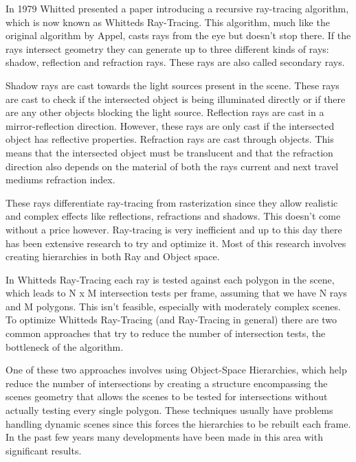 \documentclass{llncs}
\begin{document}
\medskip

In 1979 Whitted \cite{Whitted80} presented a paper introducing a recursive ray-tracing algorithm, which is now known as Whitteds Ray-Tracing. 
This algorithm, much like the original algorithm by Appel, casts rays from the eye but doesn't stop there. 
If the rays intersect geometry they can generate up to three different kinds of rays: shadow, reflection and refraction rays. These rays are also called secondary rays.

\medskip

Shadow rays are cast towards the light sources present in the scene. These rays are cast to check if the intersected object is being illuminated directly or if there are any other objects blocking the light source. 
Reflection rays are cast in a mirror-reflection direction. However, these rays are only cast if the intersected object has reflective properties. 
Refraction rays are cast through objects. This means that the intersected object must be translucent and that the refraction direction also depends on the material of both the rays current and next travel mediums refraction index.

\medskip

These rays differentiate ray-tracing from rasterization since they allow realistic and complex effects like reflections, refractions and shadows. This doesn't come without a price however. Ray-tracing is very inefficient and up to this day there has been extensive research to try and optimize it. Most of this research involves creating hierarchies in both Ray and Object space. 

\medskip

In Whitteds Ray-Tracing \cite{Whitted80} each ray is tested against each polygon in the scene, which leads to N x M intersection tests per frame, assuming that we have N rays and M polygons. This isn't feasible, especially with moderately complex scenes. To optimize Whitteds Ray-Tracing (and Ray-Tracing in general) there are two common approaches that try to reduce the number of intersection tests, the bottleneck of the algorithm.

\medskip

One of these two approaches involves using Object-Space Hierarchies, which help reduce the number of intersections by creating a structure encompassing the scenes geometry that allows the scenes to be tested for intersections without actually testing every single polygon. These techniques usually have problems handling dynamic scenes since this forces the hierarchies to be rebuilt each frame. In the past few years many developments have been made in this area with significant results.
\end{document}
